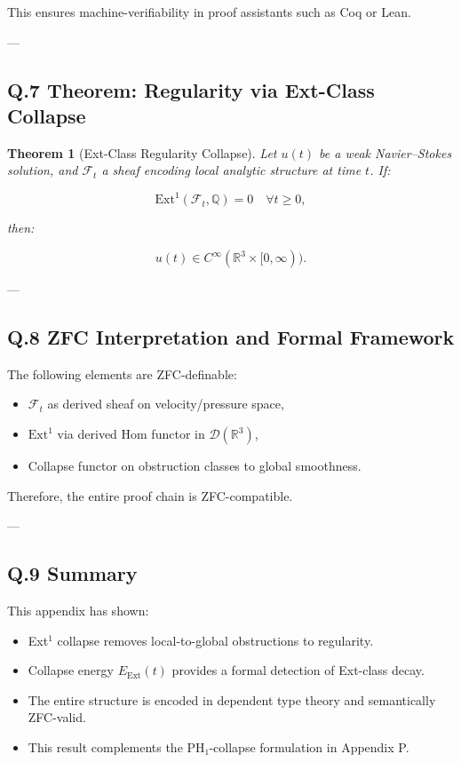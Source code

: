 \documentclass[11pt]{article}
\newtheorem{theorem}{Theorem}[section]
\begin{document}
This ensures machine-verifiability in proof assistants such as Coq or Lean.

---

\subsection*{Q.7 Theorem: Regularity via Ext-Class Collapse}

\begin{theorem}[Ext-Class Regularity Collapse]
Let $u(t)$ be a weak Navier–Stokes solution, and $\mathcal{F}_t$ a sheaf encoding local analytic structure at time $t$.  
If:

\[
\mathrm{Ext}^1(\mathcal{F}_t, \mathbb{Q}) = 0 \quad \forall t \ge 0,
\]

then:

\[
u(t) \in C^\infty(\mathbb{R}^3 \times [0, \infty)).
\]
\end{theorem}

---

\subsection*{Q.8 ZFC Interpretation and Formal Framework}

The following elements are ZFC-definable:
\begin{itemize}
  \item $\mathcal{F}_t$ as derived sheaf on velocity/pressure space,
  \item $\mathrm{Ext}^1$ via derived Hom functor in $\mathcal{D}(\mathbb{R}^3)$,
  \item Collapse functor on obstruction classes to global smoothness.
\end{itemize}

Therefore, the entire proof chain is ZFC-compatible.

---

\subsection*{Q.9 Summary}

This appendix has shown:
\begin{itemize}
  \item Ext$^1$ collapse removes local-to-global obstructions to regularity.
  \item Collapse energy $E_{\mathrm{Ext}}(t)$ provides a formal detection of Ext-class decay.
  \item The entire structure is encoded in dependent type theory and semantically ZFC-valid.
  \item This result complements the PH₁-collapse formulation in Appendix P.
\end{itemize}
\end{document}
